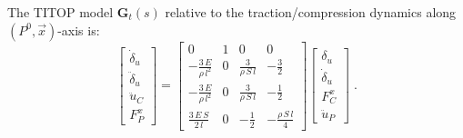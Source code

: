 \documentclass[smallcondensed]{svjour3}     %
\begin{document}
The TITOP model $\mathbf{G}_t(s)$ relative to the traction/compression dynamics along $(P^0,\vec{x})$-axis is:
\begin{equation} \label{eq:Gtss}
\left[\begin{array}{c} \dot{\delta}_u \\ \ddot{\delta}_u\\ \hline
\ddot{u}_C
 \\ 
F^x_P
 \end{array}\right]=\left[\begin{array}{cc|cc}
0 & 1 & 0 & 0\\ -\frac{3\,E}{\rho\,l^2} & 0 & \frac{3}{\rho\,S\,l} & -\frac{3}{2}\\ \hline -\frac{3\,E}{\rho\,l^2} & 0 & \frac{3}{\rho\,S\,l}  & -\frac{1}{2} \\ \frac{3\,E\,S}{2\,l} & 0 &  -\frac{1}{2} & -\frac{\rho\,S\,l}{4}\end{array}\right]\left[\begin{array}{c} \delta_u \\ \dot{\delta}_u \\ \hline  
F^x_C
\\ 
\ddot{u}_P
 \end{array}\right]
\;.
\end{equation}
\end{document}
